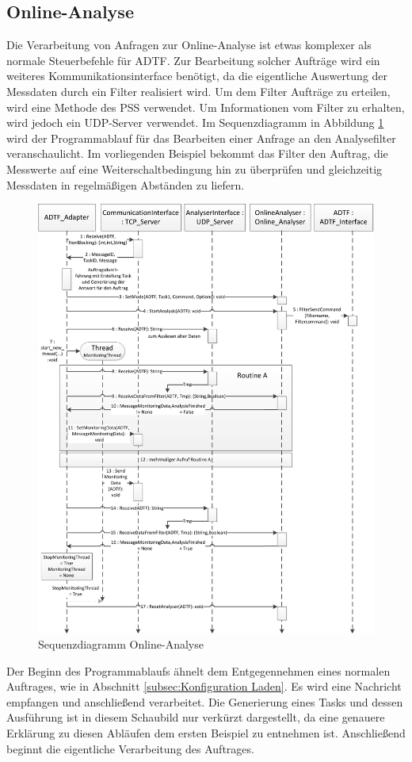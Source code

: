 \documentclass[12pt,a4paper]{report}
\begin{document}
\subsection{Online-Analyse}\label{subsec:Online Analyse}
Die Verarbeitung von Anfragen zur Online-Analyse ist etwas komplexer als normale Steuerbefehle für ADTF. Zur Bearbeitung solcher Aufträge wird ein weiteres Kommunikationsinterface benötigt, da die eigentliche Auswertung der Messdaten durch ein Filter realisiert wird. Um dem Filter Aufträge zu erteilen, wird eine Methode des PSS verwendet. Um Informationen vom Filter zu erhalten, wird jedoch ein UDP-Server verwendet. Im Sequenzdiagramm in Abbildung \ref{pic:Sequenz Online-Analyse} wird der Programmablauf für das Bearbeiten einer Anfrage an den Analysefilter veranschaulicht. Im vorliegenden Beispiel bekommt das Filter den Auftrag, die Messwerte auf eine Weiterschaltbedingung hin zu überprüfen und gleichzeitig Messdaten in regelmä\ss igen Abständen zu liefern.
\begin{figure}
\begin{center}
\includegraphics[scale=0.85]{Darstellungen/SequenzProofMonitoring}
\caption{Sequenzdiagramm Online-Analyse}\label{pic:Sequenz Online-Analyse}
\end{center}
\end{figure}
Der Beginn des Programmablaufs ähnelt dem Entgegennehmen eines normalen Auftrages, wie in Abschnitt \ref{subsec:Konfiguration Laden}. Es wird eine Nachricht empfangen und anschließend verarbeitet. Die Generierung eines Tasks und dessen Ausführung ist in diesem Schaubild nur verkürzt dargestellt, da eine genauere Erklärung zu diesen Abläufen dem ersten Beispiel zu entnehmen ist. Anschließend beginnt die eigentliche Verarbeitung des Auftrages.
\end{document}
